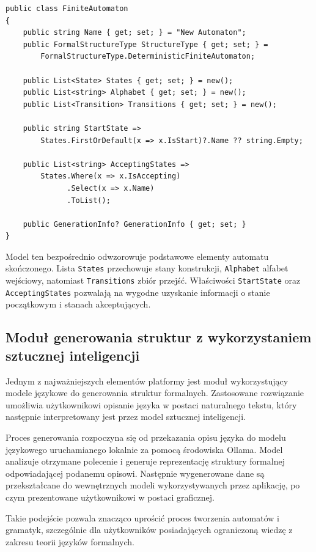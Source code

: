 \documentclass[12pt]{article}
\begin{document}
\clearpage
\begin{lstlisting}[language={[Sharp]C},
caption={Model automatu skończonego wykorzystany w aplikacji},
label={lst:finite-automaton}]
public class FiniteAutomaton
{
    public string Name { get; set; } = "New Automaton";
    public FormalStructureType StructureType { get; set; } =
        FormalStructureType.DeterministicFiniteAutomaton;

    public List<State> States { get; set; } = new();
    public List<string> Alphabet { get; set; } = new();
    public List<Transition> Transitions { get; set; } = new();

    public string StartState =>
        States.FirstOrDefault(x => x.IsStart)?.Name ?? string.Empty;

    public List<string> AcceptingStates =>
        States.Where(x => x.IsAccepting)
              .Select(x => x.Name)
              .ToList();

    public GenerationInfo? GenerationInfo { get; set; }
}
\end{lstlisting}

Model ten bezpośrednio odwzorowuje podstawowe elementy automatu skończonego.
Lista \texttt{States} przechowuje stany konstrukcji, \texttt{Alphabet} alfabet
wejściowy, natomiast \texttt{Transitions} zbiór przejść. Właściwości
\texttt{StartState} oraz \texttt{AcceptingStates} pozwalają na wygodne
uzyskanie informacji o stanie początkowym i stanach akceptujących.

\subsection{Moduł generowania struktur z wykorzystaniem sztucznej inteligencji}

Jednym z najważniejszych elementów platformy jest moduł wykorzystujący modele językowe do generowania struktur formalnych. Zastosowane rozwiązanie umożliwia użytkownikowi opisanie języka w postaci naturalnego tekstu, który następnie interpretowany jest przez model sztucznej inteligencji.

Proces generowania rozpoczyna się od przekazania opisu języka do modelu językowego uruchamianego lokalnie za pomocą środowiska Ollama. Model analizuje otrzymane polecenie i generuje reprezentację struktury formalnej odpowiadającej podanemu opisowi. Następnie wygenerowane dane są przekształcane do wewnętrznych modeli wykorzystywanych przez aplikację, po czym prezentowane użytkownikowi w postaci graficznej.

Takie podejście pozwala znacząco uprościć proces tworzenia automatów i gramatyk, szczególnie dla użytkowników posiadających ograniczoną wiedzę z zakresu teorii języków formalnych.
\\
\end{document}
